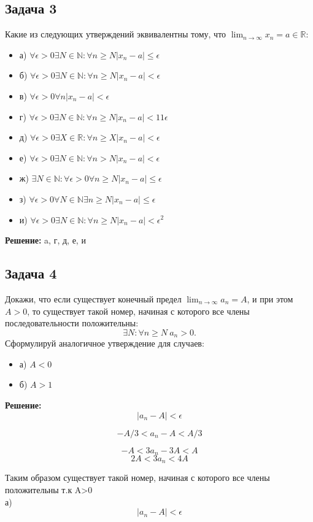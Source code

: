 \documentclass[a4paper,12pt]{article}
\begin{document}
\subsection{Задача 3}
Какие из следующих утверждений эквивалентны тому, что $\lim_{n \to \infty} x_n = a \in \mathbb{R}$:
\begin{itemize}
    \item а) $\forall \epsilon > 0 \exists N \in \mathbb{N} : \forall n \geq N |x_n - a| \leq \epsilon$
    \item б) $\forall \epsilon > 0 \exists N \in \mathbb{N} : \forall n \geq N |x_n - a| < \epsilon$
    \item в) $\forall \epsilon > 0 \forall n |x_n - a| < \epsilon$
    \item г) $\forall \epsilon > 0 \exists N \in \mathbb{N} : \forall n \geq N |x_n - a| < 11\epsilon$
    \item д) $\forall \epsilon > 0 \exists X \in \mathbb{R} : \forall n \geq X |x_n - a| < \epsilon$
    \item е) $\forall \epsilon > 0 \exists N \in \mathbb{N} : \forall n > N |x_n - a| < \epsilon$
    \item ж) $\exists N \in \mathbb{N} : \forall \epsilon > 0 \forall n \geq N |x_n - a| \leq \epsilon$
    \item з) $\forall \epsilon > 0 \forall N \in \mathbb{N} \exists n \geq N |x_n - a| \leq \epsilon$
    \item и) $\forall \epsilon > 0 \exists N \in \mathbb{N} : \forall n \geq N |x_n - a| < \epsilon^2$
\end{itemize}
\textbf{Решение:}
a, г, д, е, и
\subsection{Задача 4}
Докажи, что если существует конечный предел $\lim_{n \to \infty} a_n = A$, и при этом $A > 0$, то существует такой номер, начиная с которого все члены последовательности положительны:
\[
\exists N : \forall n \geq N \ a_n > 0.
\]
Сформулируй аналогичное утверждение для случаев:
\begin{itemize}
    \item а) $A < 0$
    \item б) $A > 1$
\end{itemize}
\textbf{Решение:}
\[
|a_n-A|<\epsilon 
\]

\[
-A/3<a_n-A<A/3
\]

\[
-A<3a_n-3A<A
\]
\[
2A<3a_n<4A
\]

Таким образом существует такой номер, начиная с которого все члены положительны т.к A>0\\
а)
\[
|a_n-A|<\epsilon 
\]
\end{document}
